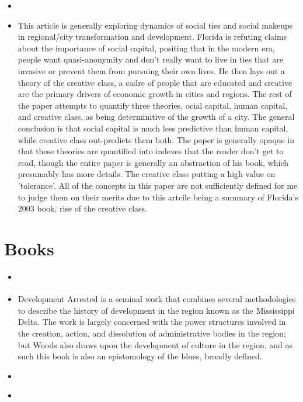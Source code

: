 \documentclass{article} \usepackage{filecontents}
\begin{document}
\begin{itemize}
\item \cite{florida2003CitiesCreative}
\item This article is generally exploring dynamics of social ties and
  social makeups in regional/city transformation and
  development. Florida is refuting claims about the importance of
  social capital, positing that in the modern era, people want
  quasi-anonymity and don't really want to live in ties that are
  invasive or prevent them from pursuing their own lives. He then lays
  out a theory of the creative class, a cadre of people that are
  educated and creative are the primary drivers of economic growth in
  cities and regions. The rest of the paper attempts to quantify three
  theories, ocial capital, human capital, and creative class, as being
  determinitive of the growth of a city. The general conclusion is
  that social capital is much less predictive than human capital,
  while creative class out-predicts them both. The paper is generally
  opaque in that these theories are quantified into indexes that the
  reader don't get to read, though the entire paper is generally an
  abstraction of his book, which presumably has more details. The
  creative class putting a high value on 'tolerance'. All of the
  concepts in this paper are not sufficiently defined for me to judge
  them on their merits due to this artcile being a summary of
  Florida's 2003 book, rise of the creative class.
  
\end{itemize}
\section{Books}
\begin{itemize}
\item \cite{woods2017DevelopmentArrested}
\item Development Arrested is a seminal work that combines several
  methodologies to describe the history of development in the region
  known as the Mississippi Delta. The work is largely concerned with
  the power structures involved in the creation, action, and
  dissolution of administrative bodies in the region; but Woods also
  draws upon the development of culture in the region, and as such
  this book is also an epistomology of the blues, broadly defined.

\item \cite{isenberg2004SymposiumWoods}

\item \cite{tiefenbacher2019DevelopmentArrested}
\end{itemize}
\end{document}
